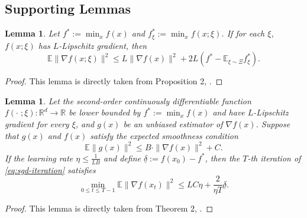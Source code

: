 \documentclass{article}
\newcommand{\EE}{\mathbb{E}}
\newcommand{\RR}{\mathbb{R}}
\theoremstyle{definition}
\theoremstyle{plain}
\newtheorem{lemma}[definition]{Lemma}
\theoremstyle{remark}
\begin{document}
\subsection{Supporting Lemmas}
\begin{lemma}\label{lemma:0} 
    Let $f^*:=\min_{x} f(x)$ and $f^*_\xi:=\min_{x} f(x;\xi)$. If for each $\xi$,  $f(x;\xi)$ has $L$-Lipschitz gradient, then
    $$\EE \| \nabla f(x;\xi)\|^2 \leq L \|\nabla f(x)\|^2 + 2L (f^* - \EE_{\xi\sim\Xi} f^*_\xi).$$
\end{lemma}
\begin{proof}
    This lemma is directly taken from Proposition 2, \citet{khaled2022better}. 
\end{proof}


\begin{lemma}\label{lemma:1}
    Let the second-order continuously differentiable function $f(\cdot\; ;\xi):\RR^d\to \RR$ be lower bounded by $f^*:=\min_x f(x)$ and have $L$-Lipschitz gradient  for every $\xi$, and $g(x)$ be an unbiased estimator of $\nabla f(x)$. Suppose that $g(x)$ and $f(x)$  satisfy the expected smoothness condition
    $$\EE \|g (x) \|^2 \leq   B\cdot \|\nabla f(x)\|^2 + C.$$
    If the learning rate $\eta\leq \frac{1}{LB}$ and define $\underline{\delta}:=f(x_0)-f^*$, then the $T$-th iteration of \ref{eq:sgd-iteration} satisfies
    $$\min_{0\leq t \leq T-1} \EE \|\nabla f(x_t)\|^2 \leq LC \eta + \frac{2}{\eta T}\underline{\delta}.$$
\end{lemma}
\begin{proof}
    This lemma is directly taken from Theorem 2, \citet{khaled2022better}.
\end{proof}
\end{document}
